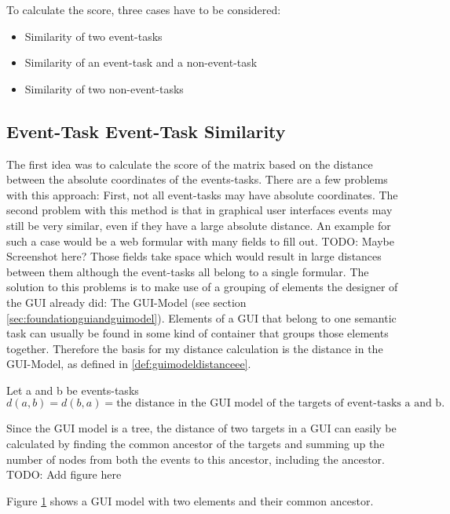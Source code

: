 To calculate the score, three cases have to be considered:
\begin{itemize}
	\item Similarity of two event-tasks
	\item Similarity of an event-task and a non-event-task
	\item Similarity of two non-event-tasks
\end{itemize}

\subsection{Event-Task Event-Task Similarity}
The first idea was to calculate the score of the matrix based on the distance between the absolute coordinates of the events-tasks. 
There are a few problems with this approach: First, not all event-tasks may have absolute coordinates. 
The second problem with this method is that in graphical user interfaces events may still be very similar, even if they have a large absolute distance.
An example for such a case would be a web formular with many fields to fill out. 
TODO: Maybe Screenshot here?
Those fields take space which would result in large distances between them although the event-tasks all belong to a single formular.
The solution to this problems is to make use of a grouping of elements the designer of the GUI already did: The GUI-Model (see section \ref{sec:foundationguiandguimodel}).
Elements of a GUI that belong to one semantic task can usually be found in some kind of container that groups those elements together. Therefore the basis for my 
distance calculation is the distance in the GUI-Model, as defined in \ref{def:guimodeldistanceee}. 

\begin{definition}
	\item Let a and b be events-tasks
\begin{equation*}d(a,b) = d(b,a) = \text{the distance in the GUI model of the targets of event-tasks a and b.}
\end{equation*}
\label{def:guimodeldistanceee}
\end{definition}

Since the GUI model is a tree, the distance of two targets in a GUI can easily be calculated by finding the common ancestor of the targets and summing up the number of nodes from both the events to this ancestor, including the ancestor.
TODO: Add figure here
\begin{figure}[h]
	\label{fig:guimodeldistance}
\end{figure}
Figure \ref{fig:guimodeldistance} shows a GUI model with two elements and their common ancestor. 


